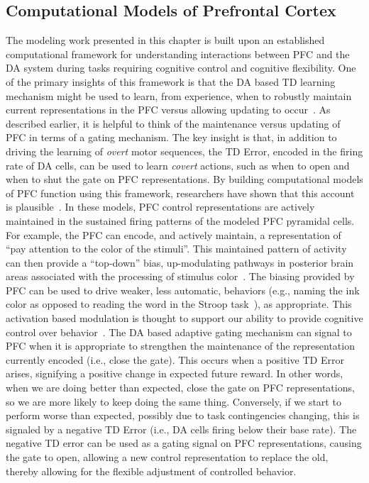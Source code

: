 


\subsection{Computational Models of Prefrontal Cortex}
The modeling work presented in this chapter is built upon an established computational framework for understanding interactions between PFC and the DA system during tasks requiring cognitive control and cognitive flexibility. One of the primary insights of this framework is that the DA based TD learning mechanism might be used to learn, from experience, when to robustly maintain current representations in the PFC versus allowing updating to occur~\cite{BraverTS:2000:Control}. As described earlier, it is helpful to think of the maintenance versus updating of PFC in terms of a gating mechanism. The key insight is that, in addition to driving the learning of \emph{overt} motor sequences, the TD Error, encoded in the firing rate of DA cells, can be used to learn \emph{covert} actions, such as when to open and when to shut the gate on PFC representations. By building computational models of PFC function using this framework, researchers have shown that this account is plausible~\cite{BraverTS:2000:Control}. In these models, PFC control representations are actively maintained in the sustained firing patterns of the modeled PFC pyramidal cells. For example, the PFC can encode, and actively maintain, a representation of ``pay attention to the color of the stimuli''. This maintained pattern of activity can then provide a ``top-down'' bias, up-modulating pathways in posterior brain areas associated with the processing of stimulus color~\cite{CohenJD:1990:Stroop}. The biasing provided by PFC can be used to drive weaker, less automatic, behaviors (e.g., naming the ink color as opposed to reading the word in the Stroop task~\cite{StroopJR:1935:Interference}), as appropriate. This activation based modulation is thought to support our ability to provide cognitive control over behavior~\cite{CohenJD:1992:Schizophrenia}. The DA based adaptive gating mechanism can signal to PFC when it is appropriate to strengthen the maintenance of the representation currently encoded (i.e., close the gate). This occurs when a positive TD Error arises, signifying a positive change in expected future reward. In other words, when we are doing better than expected, close the gate on PFC representations, so we are more likely to keep doing the same thing. Conversely, if we start to perform worse than expected, possibly due to task contingencies changing, this is signaled by a negative TD Error (i.e., DA cells firing below their base rate). The negative TD error can be used as a gating signal on PFC representations, causing the gate to open, allowing a new control representation to replace the old, thereby allowing for the flexible adjustment of controlled behavior.


